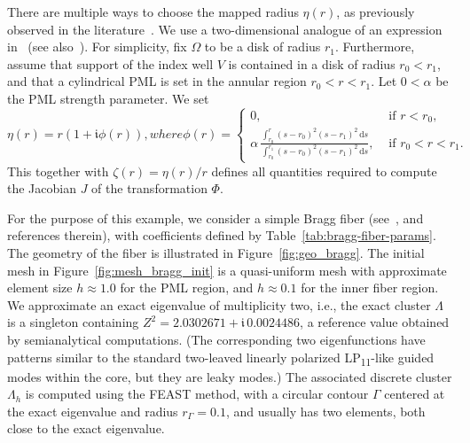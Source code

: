 \documentclass[12pt, oneside, reqno]{amsart}
\theoremstyle{remark}
\newcommand{\ii}{\mathfrak{i}}
\begin{document}
There are multiple ways to choose the mapped radius $\eta(r)$, as previously
observed in the literature~\cite{ColMon1998-1, GopParVan2022-1, KimPas2009-1, NanWes2018-1}.
We use a two-dimensional analogue of an expression in~\cite{KimPas2009-1}
(see also~\cite{GopGroPinVan2025-1}).
For simplicity, fix $\Omega$ to be a disk of radius $r_1$.
Furthermore, assume that support of the index well
$V$ is contained in a disk of radius
$r_0 < r_1$, and that a cylindrical PML is set in the annular region
\(r_0 < r < r_1\). 
Let \(0 < \alpha\) be the PML strength parameter. 
We set 
\begin{subequations}\label{eq:eta-defn}
\begin{equation}
  \eta(r)  = r(1 + \ii \phi(r)),
\end{equation}
where 
\begin{equation}
  \phi(r) =
  \begin{cases}
    0, & \text{ if } r < r_0, \\
    \alpha\, \displaystyle{
      \frac{\displaystyle{\int_{r_0}^r (s - r_0)^{2} (s - r_1)^{2} \,
      \mathrm{d}s}}{
        \displaystyle{
          \int_{r_0}^{r_1} (s - r_0)^{2} (s - r_1)^{2} \, \mathrm{d}s}
        },
      }
    & \text{ if } r_0 < r < r_1.
  \end{cases}
\end{equation}
\end{subequations}
This together with  $\zeta(r) = \eta(r) / r$ defines all quantities required
to compute the Jacobian \(J\) of the transformation \(\Phi\).


For the purpose of this example, we consider a simple Bragg fiber
(see~\cite[Section 4]{GopGroPinVan2025-1}, and references therein),
with coefficients defined by Table~\ref{tab:bragg-fiber-params}.  The
geometry of the fiber is illustrated in Figure~\ref{fig:geo_bragg}.
The initial mesh in Figure~\ref{fig:mesh_bragg_init} is a
quasi-uniform mesh with approximate element size \(h \approx 1.0\) for
the PML region, and \(h \approx 0.1\) for the inner fiber region.  We
approximate an exact eigenvalue of multiplicity two, i.e.,  
the exact cluster $\varLambda$ is a singleton containing
\(Z^2 = 2.0302671 + \ii\, 0.0024486\), a reference
value obtained by semianalytical computations.  (The corresponding two
eigenfunctions have patterns similar to the standard two-leaved
linearly polarized LP\textsubscript{11}-like guided modes within the core,
but they are leaky modes.)  The associated discrete cluster \(\varLambda_h\)
is computed using the FEAST method, with a circular contour \(\Gamma\)
centered at the exact eigenvalue and radius \(r_\Gamma = 0.1\), and usually has two elements, both close to the exact eigenvalue.
\end{document}
